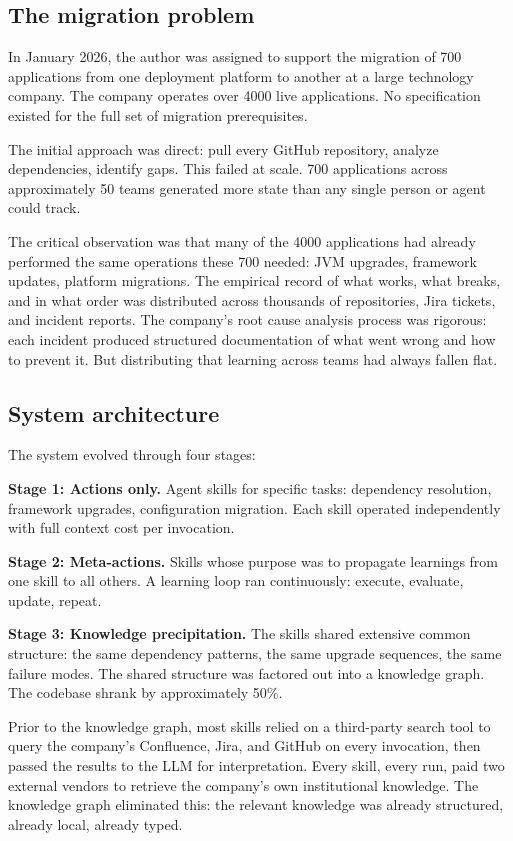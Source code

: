 \documentclass[11pt]{article}
\theoremstyle{definition}
\begin{document}
\subsection{The migration problem}

In January 2026, the author was assigned to support the migration of
700 applications from one deployment platform to another at a large
technology company. The company operates over 4000 live applications.
No specification existed for the full set of migration prerequisites.

The initial approach was direct: pull every GitHub repository, analyze
dependencies, identify gaps. This failed at scale. 700 applications
across approximately 50 teams generated more state than any single
person or agent could track.

The critical observation was that many of the 4000 applications had
already performed the same operations these 700 needed: JVM upgrades,
framework updates, platform migrations. The empirical record of what
works, what breaks, and in what order was distributed across thousands
of repositories, Jira tickets, and incident reports. The company's
root cause analysis process was rigorous: each incident produced
structured documentation of what went wrong and how to prevent it. But
distributing that learning across teams had always fallen flat.

\subsection{System architecture}

The system evolved through four stages:

\textbf{Stage 1: Actions only.} Agent skills for specific tasks:
dependency resolution, framework upgrades, configuration migration.
Each skill operated independently with full context cost per invocation.

\textbf{Stage 2: Meta-actions.} Skills whose purpose was to propagate
learnings from one skill to all others. A learning loop ran
continuously: execute, evaluate, update, repeat.

\textbf{Stage 3: Knowledge precipitation.} The skills shared extensive
common structure: the same dependency patterns, the same upgrade
sequences, the same failure modes. The shared structure was factored
out into a knowledge graph. The codebase shrank by approximately 50\%.

Prior to the knowledge graph, most skills relied on a third-party
search tool to query the company's Confluence, Jira, and GitHub on
every invocation, then passed the results to the LLM for
interpretation. Every skill, every run, paid two external vendors to
retrieve the company's own institutional knowledge. The knowledge graph
eliminated this: the relevant knowledge was already structured,
already local, already typed.
\end{document}
